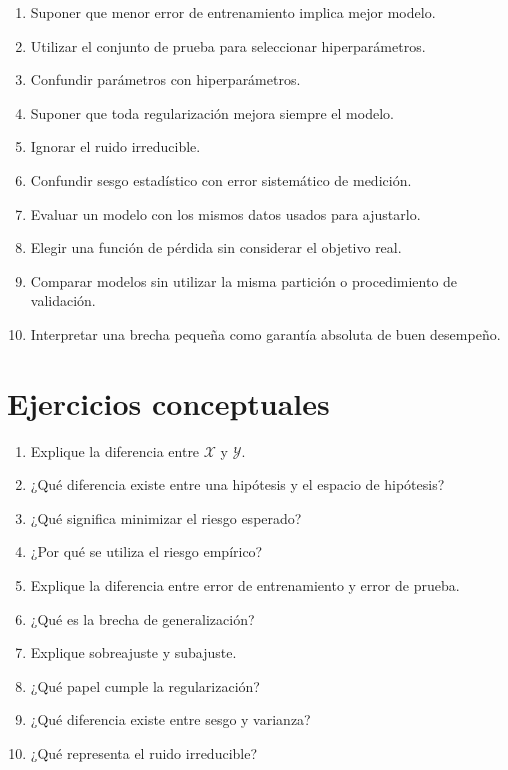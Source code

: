 \documentclass[
  spanish,
  10.5pt,
  letterpaper,
  DIV=11,
  numbers=noendperiod,
  oneside,
  open=any]{scrreprt}
\providecommand{\tightlist}{%
  \setlength{\itemsep}{0pt}\setlength{\parskip}{0pt}}
\theoremstyle{definition}
\theoremstyle{definition}
\theoremstyle{plain}
\theoremstyle{remark}
\begin{document}
\begin{enumerate}
\def\labelenumi{\arabic{enumi}.}
\tightlist
\item
  Suponer que menor error de entrenamiento implica mejor modelo.
\item
  Utilizar el conjunto de prueba para seleccionar hiperparámetros.
\item
  Confundir parámetros con hiperparámetros.
\item
  Suponer que toda regularización mejora siempre el modelo.
\item
  Ignorar el ruido irreducible.
\item
  Confundir sesgo estadístico con error sistemático de medición.
\item
  Evaluar un modelo con los mismos datos usados para ajustarlo.
\item
  Elegir una función de pérdida sin considerar el objetivo real.
\item
  Comparar modelos sin utilizar la misma partición o procedimiento de
  validación.
\item
  Interpretar una brecha pequeña como garantía absoluta de buen
  desempeño.
\end{enumerate}

\section*{Ejercicios conceptuales}\label{ejercicios-conceptuales-4}


\begin{enumerate}
\def\labelenumi{\arabic{enumi}.}
\tightlist
\item
  Explique la diferencia entre \(\mathcal{X}\) y \(\mathcal{Y}\).
\item
  ¿Qué diferencia existe entre una hipótesis y el espacio de hipótesis?
\item
  ¿Qué significa minimizar el riesgo esperado?
\item
  ¿Por qué se utiliza el riesgo empírico?
\item
  Explique la diferencia entre error de entrenamiento y error de prueba.
\item
  ¿Qué es la brecha de generalización?
\item
  Explique sobreajuste y subajuste.
\item
  ¿Qué papel cumple la regularización?
\item
  ¿Qué diferencia existe entre sesgo y varianza?
\item
  ¿Qué representa el ruido irreducible?
\end{enumerate}
\end{document}
